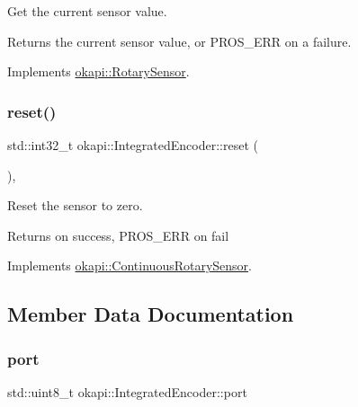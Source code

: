 Get the current sensor value.

\begin{DoxyReturn}{Returns}
the current sensor value, or {\ttfamily P\+R\+O\+S\+\_\+\+E\+RR} on a failure. 
\end{DoxyReturn}


Implements \mbox{\hyperlink{classokapi_1_1RotarySensor_ac5534dc6c3bcbd8ea2f4e54a04cda734}{okapi\+::\+Rotary\+Sensor}}.

\mbox{\label{classokapi_1_1IntegratedEncoder_a1f95f00f59911a87a9a38633343f4311}} 
\subsubsection{\texorpdfstring{reset()}{reset()}}
{\footnotesize\ttfamily std\+::int32\+\_\+t okapi\+::\+Integrated\+Encoder\+::reset (\begin{DoxyParamCaption}{ }\end{DoxyParamCaption})\hspace{0.3cm}{\ttfamily [override]}, {\ttfamily [virtual]}}

Reset the sensor to zero.

\begin{DoxyReturn}{Returns}
{} on success, {\ttfamily P\+R\+O\+S\+\_\+\+E\+RR} on fail 
\end{DoxyReturn}


Implements \mbox{\hyperlink{classokapi_1_1ContinuousRotarySensor_ae7268b0603097ac2d93a67e4fefa43e0}{okapi\+::\+Continuous\+Rotary\+Sensor}}.



\subsection{Member Data Documentation}
\mbox{\label{classokapi_1_1IntegratedEncoder_a1eb50864ff5509d1d11073325f2353fa}} 
\subsubsection{\texorpdfstring{port}{port}}
{\footnotesize\ttfamily std\+::uint8\+\_\+t okapi\+::\+Integrated\+Encoder\+::port\hspace{0.3cm}{\ttfamily [protected]}}

